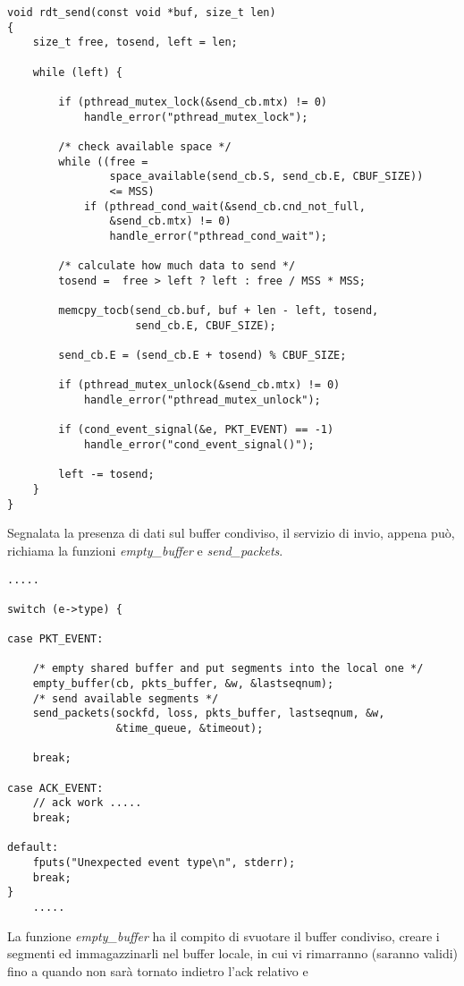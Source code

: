 \begin{lstlisting}[title=trasport.c]
void rdt_send(const void *buf, size_t len)
{
    size_t free, tosend, left = len;

    while (left) {

        if (pthread_mutex_lock(&send_cb.mtx) != 0)
            handle_error("pthread_mutex_lock");

        /* check available space */
        while ((free =
                space_available(send_cb.S, send_cb.E, CBUF_SIZE))
				<= MSS)
            if (pthread_cond_wait(&send_cb.cnd_not_full, 
				&send_cb.mtx) != 0)
                handle_error("pthread_cond_wait");

        /* calculate how much data to send */
        tosend =  free > left ?	left : free / MSS * MSS;

        memcpy_tocb(send_cb.buf, buf + len - left, tosend, 
					send_cb.E, CBUF_SIZE);

        send_cb.E = (send_cb.E + tosend) % CBUF_SIZE;

        if (pthread_mutex_unlock(&send_cb.mtx) != 0)
            handle_error("pthread_mutex_unlock");

        if (cond_event_signal(&e, PKT_EVENT) == -1)
            handle_error("cond_event_signal()");

        left -= tosend;
    }
}
\end{lstlisting}
%
Segnalata la presenza di dati sul buffer condiviso, il servizio di invio,
appena può, richiama la funzioni \emph{empty\_buffer} e \emph{send\_packets}.
%
\begin{lstlisting}[title=transport.c]
	.....

switch (e->type) {

case PKT_EVENT:

	/* empty shared buffer and put segments into the local one */
	empty_buffer(cb, pkts_buffer, &w, &lastseqnum);
	/* send available segments */
	send_packets(sockfd, loss, pkts_buffer, lastseqnum, &w,
				 &time_queue, &timeout);

	break;

case ACK_EVENT:
    // ack work .....
	break;

default:
	fputs("Unexpected event type\n", stderr);
	break;
}
	.....

\end{lstlisting}
%
La funzione \emph{empty\_buffer} ha il compito di svuotare il buffer condiviso,
creare i segmenti ed immagazzinarli nel buffer locale, in cui vi rimarranno
(saranno validi) fino a quando non sarà tornato indietro l'ack relativo e 
